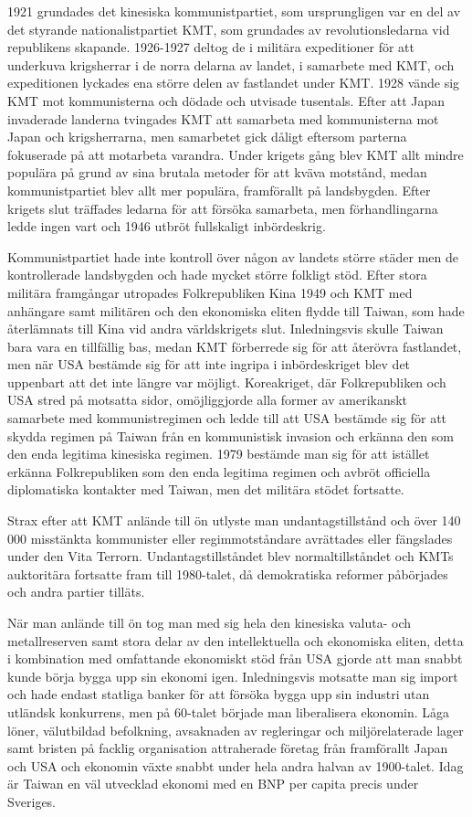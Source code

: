 \documentclass[a4paper,10pt]{article}
\begin{document}
1921 grundades det kinesiska kommunistpartiet, som ursprungligen var en del av det styrande nationalistpartiet KMT, som grundades av revolutionsledarna vid republikens skapande. 1926-1927 deltog de i militära expeditioner för att underkuva krigsherrar i de norra delarna av landet, i samarbete med KMT, och expeditionen lyckades ena större delen av fastlandet under KMT. 1928 vände sig KMT mot kommunisterna och dödade och utvisade tusentals. Efter att Japan invaderade landerna tvingades KMT att samarbeta med kommunisterna mot Japan och krigsherrarna, men samarbetet gick dåligt eftersom parterna fokuserade på att motarbeta varandra. Under krigets gång blev KMT allt mindre populära på grund av sina brutala metoder för att kväva motstånd, medan kommunistpartiet blev allt mer populära, framförallt på landsbygden. Efter krigets slut träffades ledarna för att försöka samarbeta, men förhandlingarna ledde ingen vart och 1946 utbröt fullskaligt inbördeskrig.

Kommunistpartiet hade inte kontroll över någon av landets större städer men de kontrollerade landsbygden och hade mycket större folkligt stöd. Efter stora militära framgångar utropades Folkrepubliken Kina 1949 och KMT med anhängare samt militären och den ekonomiska eliten flydde till Taiwan, som hade återlämnats till Kina vid andra världskrigets slut. Inledningsvis skulle Taiwan bara vara en tillfällig bas, medan KMT förberrede sig för att återövra fastlandet, men när USA bestämde sig för att inte ingripa i inbördeskriget blev det uppenbart att det inte längre var möjligt. Koreakriget, där Folkrepubliken och USA stred på motsatta sidor, omöjliggjorde alla former av amerikanskt samarbete med kommunistregimen och ledde till att USA bestämde sig för att skydda regimen på Taiwan från en kommunistisk invasion och erkänna den som den enda legitima kinesiska regimen. 1979 bestämde man sig för att istället erkänna Folkrepubliken som den enda legitima regimen och avbröt officiella diplomatiska kontakter med Taiwan, men det militära stödet fortsatte.

Strax efter att KMT anlände till ön utlyste man undantagstillstånd och över 140 000 misstänkta kommunister eller regimmotståndare avrättades eller fängslades under den Vita Terrorn. Undantagstillståndet blev normaltillståndet och KMTs auktoritära fortsatte fram till 1980-talet, då demokratiska reformer påbörjades och andra partier tilläts.

När man anlände till ön tog man med sig hela den kinesiska valuta- och metallreserven samt stora delar av den intellektuella och ekonomiska eliten, detta i kombination med omfattande ekonomiskt stöd från USA gjorde att man snabbt kunde börja bygga upp sin ekonomi igen. Inledningsvis motsatte man sig import och hade endast statliga banker för att försöka bygga upp sin industri utan utländsk konkurrens, men på 60-talet började man liberalisera ekonomin. Låga löner, välutbildad befolkning, avsaknaden av regleringar och miljörelaterade lager samt bristen på facklig organisation attraherade företag från framförallt Japan och USA och ekonomin växte snabbt under hela andra halvan av 1900-talet. Idag är Taiwan en väl utvecklad ekonomi med en BNP per capita precis under Sveriges.
\end{document}
